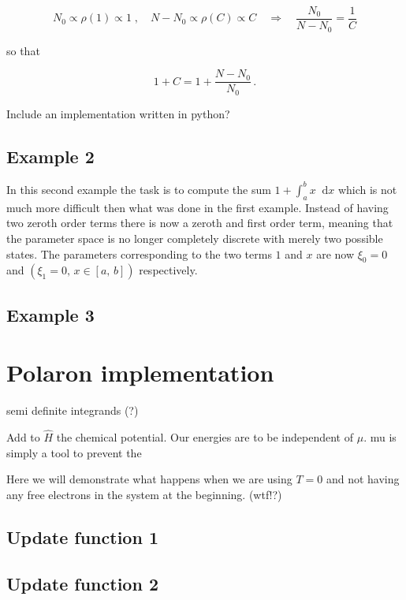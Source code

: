 \documentclass[12pt]{report}
\newcommand*\diff{\mathop{}\!\mathrm{d}}
\newcommand{\todo}[1]{{\leavevmode\color{todo}#1}}
\begin{document}
\begin{equation}
	N_0 \propto \rho(1) \propto 1
	\; , \quad
	N - N_0 \propto \rho(C) \propto C
	\quad \Rightarrow \quad
	\frac{N_0}{N - N_0} = \frac{1}{C}
\end{equation}

so that

\begin{equation}
	1 + C = 1 + \frac{N - N_0}{N_0} \,.
\end{equation}

\todo{Include an implementation written in python?}

\subsection{Example 2}

In this second example the task is to compute the sum $ 1 + \int_a^b x \diff x $ which is not much more difficult then what was done in the first example. Instead of having two zeroth order terms there is now a zeroth and first order term, meaning that the parameter space is no longer completely discrete with merely two possible states. The parameters corresponding to the two terms $ 1 $ and $ x $ are now $ \xi_0 = 0 $ and $ (\xi_1 = 0, \, x \in [a, \, b]) $ respectively.






\subsection{Example 3}

\section{Polaron implementation}

\todo{semi definite integrands (?)}


\todo{Add to $ \hat H $ the chemical potential. Our energies are to be independent of $ \mu $. mu is simply a tool to prevent the}

\todo{Here we will demonstrate what happens when we are using $ T = 0 $ and not having any free electrons in the system at the beginning. (wtf!?)}

\subsection{Update function 1}
\subsection{Update function 2}
\end{document}
